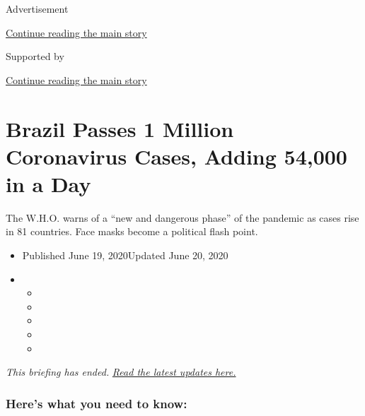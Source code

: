 Advertisement

\protect\hyperlink{after-top}{Continue reading the main story}

Supported by

\protect\hyperlink{after-sponsor}{Continue reading the main story}

\hypertarget{brazil-passes-1-million-coronavirus-cases-adding-54000-in-a-day}{%
\section{Brazil Passes 1 Million Coronavirus Cases, Adding 54,000 in a
Day}\label{brazil-passes-1-million-coronavirus-cases-adding-54000-in-a-day}}

The W.H.O. warns of a ``new and dangerous phase'' of the pandemic as
cases rise in 81 countries. Face masks become a political flash point.

\begin{itemize}
\item
  Published June 19, 2020Updated June 20, 2020
\item
  \begin{itemize}
  \item
  \item
  \item
  \item
  \item
  \end{itemize}
\end{itemize}

\emph{This briefing has ended.}
\href{https://www.nytimes3xbfgragh.onion/2020/06/20/world/coronavirus-updates.html}{\emph{Read
the latest updates here.}}

\hypertarget{heres-what-you-need-to-know}{%
\subsubsection{Here's what you need to
know:}\label{heres-what-you-need-to-know}}

